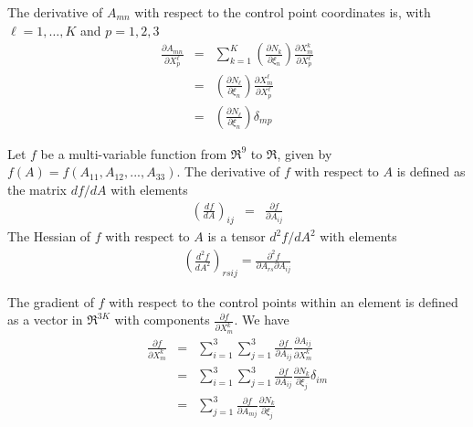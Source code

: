\noindent The derivative of $A_{mn}$ with respect to the control point 
coordinates is, with $\ell=1,\ldots,K$ and $p=1,2,3$
\begin{eqnarray}
\frac{\partial A_{mn}}{\partial X_p^\ell} & = &  \sum_{k=1}^K \left( \frac{\partial N_k}{\partial \xi_n} \right) \frac{\partial X_m^k}{\partial X_p^\ell} \\
  & = &  \left( \frac{\partial N_\ell}{\partial \xi_n} \right) \frac{\partial X_m^\ell}{\partial X_p^\ell} \\
  & = &  \left( \frac{\partial N_\ell}{\partial \xi_n} \right) \delta_{m p}
\end{eqnarray}

 \newline
Let $f$ be a multi-variable function from $\Re^9$ to $\Re$, given by 
$f(A) = f(A_{11},A_{12},...,A_{33})$.  The derivative of $f$ with respect 
to $A$ is defined as the matrix $df/dA$ with elements
\begin{eqnarray}
\left( \frac{df}{dA} \right)_{ij} & = & \frac{\partial f}{\partial A_{ij}}
\end{eqnarray}
The Hessian of $f$ with respect to $A$ is a tensor $d^2 f/ dA^2$ with elements
\begin{eqnarray}
\left( \frac{d^2 f}{d A^2} \right)_{rsij} = \frac{\partial^2 f}{\partial A_{rs} \partial A_{ij}}
\end{eqnarray}

\newline The gradient of $f$ with respect to the control points within an
element is defined as a vector in $\Re^{3K}$ with components 
$\frac{\partial f}{\partial X_m^k}$. We have
\begin{eqnarray}
\frac{\partial f}{\partial X_m^k} & = & \sum_{i=1}^3 \sum_{j=1}^3 \frac{\partial f}{\partial A_{ij}} \frac{\partial A_{ij}}{\partial X_m^k} \\
& = & \sum_{i=1}^3 \sum_{j=1}^3 \frac{\partial f}{\partial A_{ij}} \frac{\partial N_k}{\partial \xi_j} \delta_{im} \\
 & = & \sum_{j=1}^3 \frac{\partial f}{\partial A_{mj}} \frac{\partial N_k}{\partial \xi_j}
\end{eqnarray}

